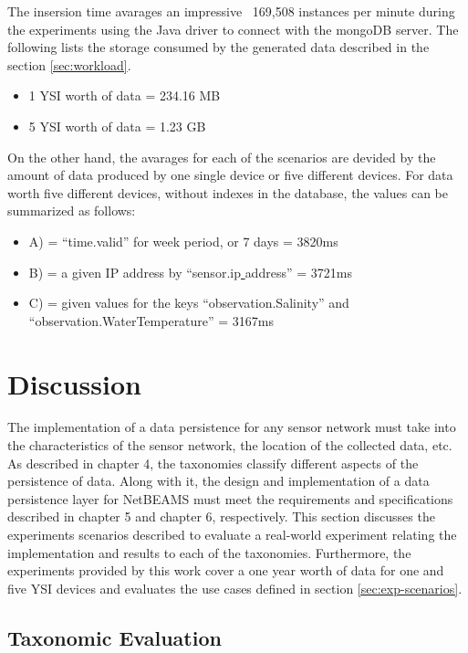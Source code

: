 The insersion time avarages an impressive ~169,508 instances per minute during
the experiments using the Java driver to connect with the mongoDB server. The
following lists the storage consumed by the generated data described in the
section \ref{sec:workload}.

\begin{itemize}
  \item 1 YSI worth of data = 234.16 MB 
  \item 5 YSI worth of data = 1.23 GB
\end{itemize}

On the other hand, the avarages for each of the scenarios are devided by the
amount of data produced by one single device or five different devices. For
data worth five different devices, without indexes in the database, the values
can be summarized as follows:

\begin{itemize}
  \item A) = ``time.valid'' for week period, or 7 days = 3820ms
  \item B) = a given IP address by ``sensor.ip\underline{ }address'' = 3721ms
  \item C) = given values for the keys ``observation.Salinity'' and 
  ``observation.WaterTemperature'' = 3167ms
\end{itemize}

\section{Discussion}

The implementation of a data persistence for any sensor network must take into
the characteristics of the sensor network, the location of the collected data,
etc. As described in chapter 4, the taxonomies classify different aspects of
the persistence of data. Along with it, the design and implementation of a data
persistence layer for NetBEAMS must meet the requirements and specifications
described in chapter 5 and chapter 6, respectively. This section discusses the
experiments scenarios described to evaluate a real-world experiment relating
the implementation and results to each of the taxonomies. Furthermore, the
experiments provided by this work cover a one year worth of data for one and
five YSI devices and evaluates the use cases defined in section
\ref{sec:exp-scenarios}.

\subsection{Taxonomic Evaluation}

